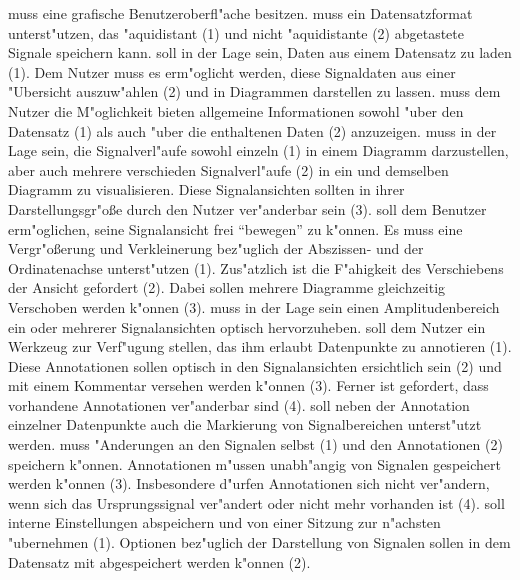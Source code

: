 \begin{enumerate}
	 muss eine grafische Benutzeroberfl"ache besitzen.
	 muss ein Datensatzformat unterst"utzen, das "aquidistant (1) und nicht "aquidistante (2) abgetastete Signale speichern kann.
	 soll in der Lage sein, Daten aus einem Datensatz zu laden (1).
						 Dem Nutzer muss es erm"oglicht werden, diese Signaldaten aus einer "Ubersicht auszuw"ahlen (2) und in Diagrammen darstellen zu lassen.
	 muss dem Nutzer die M"oglichkeit bieten allgemeine Informationen sowohl "uber den Datensatz (1) als auch "uber die enthaltenen Daten (2) anzuzeigen.
	 muss in der Lage sein, die Signalverl"aufe sowohl einzeln (1) in einem Diagramm darzustellen, aber auch mehrere verschieden Signalverl"aufe (2) in ein und demselben Diagramm zu visualisieren.
				  Diese Signalansichten sollten in ihrer Darstellungsgr"o\ss e durch den Nutzer ver"anderbar sein (3).
	 soll dem Benutzer erm"oglichen, seine Signalansicht frei "`bewegen"' zu k"onnen.
				 Es muss eine Vergr"o\ss erung und Verkleinerung bez"uglich der Abszissen- und der Ordinatenachse unterst"utzen (1).
				 Zus"atzlich ist die F"ahigkeit des Verschiebens der Ansicht gefordert (2).
				 Dabei sollen mehrere Diagramme gleichzeitig Verschoben werden k"onnen (3).
	 muss in der Lage sein einen Amplitudenbereich ein oder mehrerer Signalansichten optisch hervorzuheben.
	 soll dem Nutzer ein Werkzeug zur Verf"ugung stellen, das ihm erlaubt Datenpunkte zu annotieren (1).
					  Diese Annotationen sollen optisch in den Signalansichten ersichtlich sein (2) und mit einem Kommentar versehen werden k"onnen (3).
				  	  Ferner ist gefordert, dass vorhandene Annotationen ver"anderbar sind (4).
	 soll neben der Annotation einzelner Datenpunkte auch die Markierung von Signalbereichen unterst"utzt werden.
	 muss "Anderungen an den Signalen selbst (1) und den Annotationen (2) speichern k"onnen.
			Annotationen m"ussen unabh"angig von Signalen gespeichert werden k"onnen (3).
			Insbesondere d"urfen Annotationen sich nicht ver"andern, wenn sich das Ursprungssignal ver"andert oder nicht mehr vorhanden ist (4).
	 soll interne Einstellungen abspeichern und von einer Sitzung zur n"achsten "ubernehmen (1).
					   Optionen bez"uglich der Darstellung von Signalen sollen in dem Datensatz mit abgespeichert werden k"onnen (2).
\end{enumerate}

